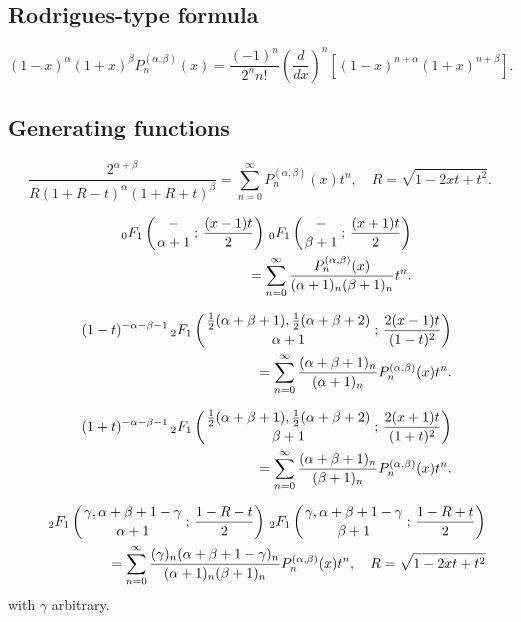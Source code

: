\documentclass[envcountchap,graybox]{svmono}
\newcommand{\hyp}[5]{\mbox{}_{#1}{F}_{#2}
\left(\genfrac{}{}{0pt}{}{#3}{#4}\,;\,#5\right)}
\begin{document}
\subsection*{Rodrigues-type formula}
\begin{equation}
\label{RodJacobi}
(1-x)^{\alpha}(1+x)^{\beta}P_n^{(\alpha,\beta)}(x)=
\frac{(-1)^n}{2^nn!}\left(\frac{d}{dx}\right)^n
\left[(1-x)^{n+\alpha}(1+x)^{n+\beta}\right].
\end{equation}

\subsection*{Generating functions}
\begin{equation}
\label{GenJacobi1}
\frac{2^{\alpha+\beta}}{R(1+R-t)^{\alpha}(1+R+t)^{\beta}}=
\sum_{n=0}^{\infty}P_n^{(\alpha,\beta)}(x)t^n,\quad R=\sqrt{1-2xt+t^2}.
\end{equation}

\begin{eqnarray}
\label{GenJacobi2}
& &\hyp{0}{1}{-}{\alpha+1}{\frac{(x-1)t}{2}}\,\hyp{0}{1}{-}{\beta+1}{\frac{(x+1)t}{2}}\nonumber\\
& &{}=\sum_{n=0}^{\infty}\frac{P_n^{(\alpha,\beta)}(x)}{(\alpha+1)_n(\beta+1)_n}t^n.
\end{eqnarray}

\begin{eqnarray}
\label{GenJacobi3}
& &(1-t)^{-\alpha-\beta-1}\,\hyp{2}{1}{\frac{1}{2}(\alpha+\beta+1),\frac{1}{2}(\alpha+\beta+2)}
{\alpha+1}{\frac{2(x-1)t}{(1-t)^2}}\nonumber\\
& &{}=\sum_{n=0}^{\infty}\frac{(\alpha+\beta+1)_n}{(\alpha+1)_n}P_n^{(\alpha,\beta)}(x)t^n.
\end{eqnarray}

\begin{eqnarray}
\label{GenJacobi4}
& &(1+t)^{-\alpha-\beta-1}\,\hyp{2}{1}{\frac{1}{2}(\alpha+\beta+1),\frac{1}{2}(\alpha+\beta+2)}
{\beta+1}{\frac{2(x+1)t}{(1+t)^2}}\nonumber\\
& &{}=\sum_{n=0}^{\infty}\frac{(\alpha+\beta+1)_n}{(\beta+1)_n}P_n^{(\alpha,\beta)}(x)t^n.
\end{eqnarray}

\begin{eqnarray}
\label{GenJacobi5}
& &\hyp{2}{1}{\gamma,\alpha+\beta+1-\gamma}{\alpha+1}{\frac{1-R-t}{2}}\,
\hyp{2}{1}{\gamma,\alpha+\beta+1-\gamma}{\beta+1}{\frac{1-R+t}{2}}\nonumber\\
& &{}=\sum_{n=0}^{\infty}
\frac{(\gamma)_n(\alpha+\beta+1-\gamma)_n}{(\alpha+1)_n(\beta+1)_n}P_n^{(\alpha,\beta)}(x)t^n,
\quad R=\sqrt{1-2xt+t^2}
\end{eqnarray}
with $\gamma$ arbitrary.
\end{document}
